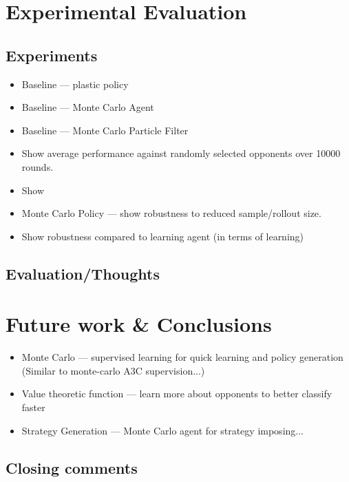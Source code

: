 \section{Experimental Evaluation} \label{Experiments}


\subsection{Experiments}
\begin{itemize}
    \item Baseline --- plastic policy
    \item Baseline --- Monte Carlo Agent
    \item Baseline --- Monte Carlo Particle Filter
    \item Show average performance against randomly selected opponents over 10000 rounds. 
    \item Show 
    \item Monte Carlo Policy --- show robustness to reduced sample/rollout size. 
    \item Show robustness compared to learning agent (in terms of learning)
\end{itemize}
\subsection{Evaluation/Thoughts}
\section{Future work \& Conclusions}\label{Conclusion}
\begin{itemize}
    \item Monte Carlo --- supervised learning for quick learning and policy generation (Similar to monte-carlo A3C supervision...)
    \item Value theoretic function --- learn more about opponents to better classify faster
    \item Strategy Generation --- Monte Carlo agent for strategy imposing... 
\end{itemize}
\subsection{Closing comments}